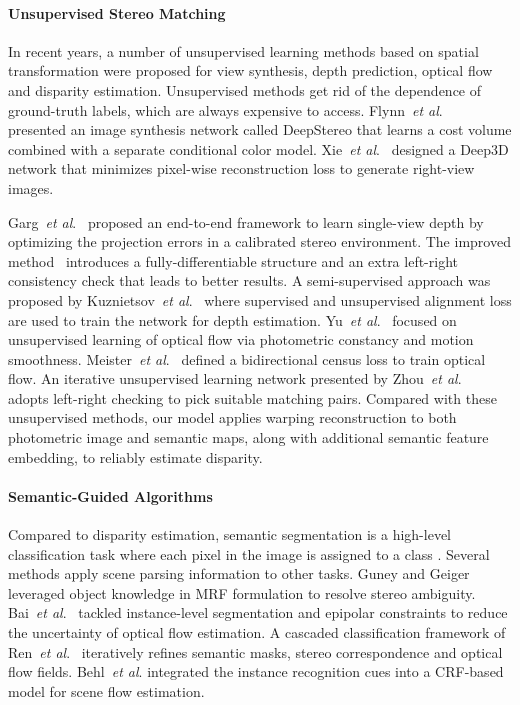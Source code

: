 \documentclass[runningheads]{llncs}
\newcommand{\etal}{\textit{et al}.}
\begin{document}
\paragraph{\textbf{Unsupervised Stereo Matching}}
In recent years, a number of unsupervised learning methods based on spatial transformation were proposed for view synthesis, depth prediction, optical flow and disparity estimation. Unsupervised methods get rid of the dependence of ground-truth labels, which are always expensive to access. Flynn~\etal~\cite{Flynn_2016_CVPR} presented an image synthesis network called {DeepStereo} that learns a cost volume combined with a separate conditional color model. Xie~\etal~\cite{xie2016deep3d} designed a {Deep3D} network that minimizes pixel-wise reconstruction loss to generate right-view images. 

Garg~\etal~\cite{garg2016unsupervised} proposed an end-to-end framework to learn single-view depth by optimizing the projection errors in a calibrated stereo environment. The improved method~\cite{monodepth17} introduces a fully-differentiable structure and an extra left-right consistency check that leads to better results. A semi-supervised approach was proposed by Kuznietsov~\etal~\cite{kuznietsov2017semi} where supervised and unsupervised alignment loss are used to train the network for depth estimation. Yu~\etal~\cite{jason2016back} focused on unsupervised learning of optical flow via photometric constancy and motion smoothness. Meister~\etal~\cite{Meister2018UnFlow} defined a bidirectional census loss to train optical flow. An iterative unsupervised learning network presented by Zhou~\etal~\cite{zhou2017stereo} adopts left-right checking to pick suitable matching pairs. Compared with these unsupervised methods, our model applies warping reconstruction to both photometric image and semantic maps, along with additional semantic feature embedding, to reliably estimate disparity.

\paragraph{\textbf{Semantic-Guided Algorithms}}

Compared to disparity estimation, semantic segmentation is a high-level classification task where each pixel in the image is assigned to a class \cite{long2015fully,badrinarayanan2015segnet,chen2015semantic,zhao2017pspnet}. Several methods apply scene parsing information to other tasks. Guney and Geiger~\cite{guney2015displets} leveraged object knowledge in MRF formulation to resolve stereo ambiguity. Bai~\etal~\cite{Bai2016Exploiting} tackled instance-level segmentation and epipolar constraints to reduce the uncertainty of optical flow estimation. A cascaded classification framework of Ren~\etal~\cite{ren2017cascaded} iteratively refines semantic masks, stereo correspondence and optical flow fields. Behl~\etal\cite{behl2017bounding} integrated the instance recognition cues into a CRF-based model for scene flow estimation. 
\end{document}
